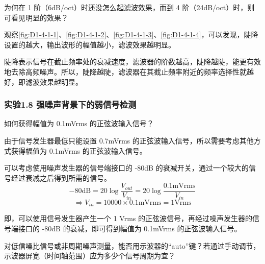 \documentclass[dvipsnames, svgnames,a4paper,11pt]{article}
\begin{document}
		\begin{tcolorbox}[colback=yellow!20, colframe=black!75, title=【问题 8】]
			为何在 1 阶（6dB/oct）时还没怎么起滤波效果，而到 4 阶（24dB/oct）时，则可看见明显的效果？
		\end{tcolorbox}

		观察\cref{fig:D1-4-1-1}、\cref{fig:D1-4-1-2}、\cref{fig:D1-4-1-3}、\cref{fig:D1-4-1-4}，可以发现，陡降设置的越大，输出波形的幅值越小，滤波效果越明显。

		陡降表示信号在截止频率处的衰减速度，滤波器的阶数越高，陡降越陡，能更有效地去除高频噪声。所以，陡降越陡，滤波器在其截止频率附近的频率选择性就越好，即滤波效果越明显。





	\subsubsection*{实验1.8 \quad 强噪声背景下的弱信号检测}

		\begin{tcolorbox}[colback=yellow!20, colframe=black!75, title=【问题 12】]
			如何获得幅值为 0.1mVrms 的正弦波输入信号？
		\end{tcolorbox}

		由于信号发生器最低只能设置 0.7mVrms 的正弦波输入信号，所以需要考虑其他方式获得幅值为 0.1mVrms 的正弦波输入信号。

		可以考虑使用噪声发生器的信号端接口的 -80dB 的衰减开关，通过一个较大的信号经过衰减之后得到所需的信号。
		\[
			- 80 \mathrm{dB} = 20 \log \frac{V_{out}}{V_{in}} = 20 \log \frac{0.1 \mathrm{mVrms}}{V_{in}}
		\]
		\[
			\Rightarrow V_{in} = 10000 \times 0.1 \mathrm{mVrms} = 1 \mathrm{Vrms}
		\]

		即，可以使用信号发生器产生一个 1 Vrms 的正弦波信号，再经过噪声发生器的信号端接口的 -80dB 的衰减，即可得到幅值为 0.1mVrms 的正弦波输入信号。



		\begin{tcolorbox}[colback=yellow!20, colframe=black!75, title=【问题 13】]
			对低信噪比信号或非周期噪声测量，能否用示波器的“auto”键？若通过手动调节，示波器屏宽（时间轴范围）应为多少个信号周期为宜？
		\end{tcolorbox}
\end{document}
